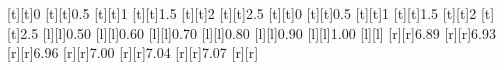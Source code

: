 %
[t][t]{0}%
[t][t]{0.5}%
[t][t]{1}%
[t][t]{1.5}%
[t][t]{2}%
[t][t]{2.5}%
[t][t]{0}%
[t][t]{0.5}%
[t][t]{1}%
[t][t]{1.5}%
[t][t]{2}%
[t][t]{2.5}%
%
[l][l]{0.50}%
[l][l]{0.60}%
[l][l]{0.70}%
[l][l]{0.80}%
[l][l]{0.90}%
[l][l]{1.00}%
[l][l]{}%
[r][r]{6.89}%
[r][r]{6.93}%
[r][r]{6.96}%
[r][r]{7.00}%
[r][r]{7.04}%
[r][r]{7.07}%
[r][r]{}%
%
%
